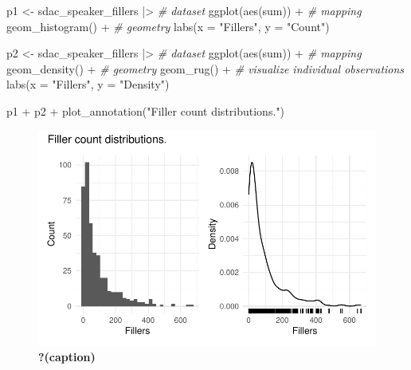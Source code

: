 \documentclass[
  letterpaper,
]{latex/krantz}
\newenvironment{Shaded}{\begin{snugshade}}{\end{snugshade}}
\newcommand{\AttributeTok}[1]{\textcolor[rgb]{0.00,0.00,0.00}{#1}}
\newcommand{\CommentTok}[1]{\textcolor[rgb]{0.00,0.00,0.00}{\textit{#1}}}
\newcommand{\FunctionTok}[1]{\textcolor[rgb]{0.00,0.00,0.00}{#1}}
\newcommand{\NormalTok}[1]{\textcolor[rgb]{0.00,0.00,0.00}{#1}}
\newcommand{\OtherTok}[1]{\textcolor[rgb]{0.00,0.00,0.00}{#1}}
\newcommand{\SpecialCharTok}[1]{\textcolor[rgb]{0.00,0.00,0.00}{#1}}
\newcommand{\StringTok}[1]{\textcolor[rgb]{0.00,0.00,0.00}{#1}}
\begin{document}
\begin{Shaded}
\begin{Highlighting}[]
\NormalTok{p1 }\OtherTok{\textless{}{-}} 
\NormalTok{  sdac\_speaker\_fillers }\SpecialCharTok{|\textgreater{}} \CommentTok{\# dataset}
  \FunctionTok{ggplot}\NormalTok{(}\FunctionTok{aes}\NormalTok{(sum)) }\SpecialCharTok{+} \CommentTok{\# mapping}
  \FunctionTok{geom\_histogram}\NormalTok{() }\SpecialCharTok{+}  \CommentTok{\# geometry}
  \FunctionTok{labs}\NormalTok{(}\AttributeTok{x =} \StringTok{"Fillers"}\NormalTok{, }\AttributeTok{y =} \StringTok{"Count"}\NormalTok{)}

\NormalTok{p2 }\OtherTok{\textless{}{-}} 
\NormalTok{  sdac\_speaker\_fillers }\SpecialCharTok{|\textgreater{}} \CommentTok{\# dataset}
  \FunctionTok{ggplot}\NormalTok{(}\FunctionTok{aes}\NormalTok{(sum)) }\SpecialCharTok{+} \CommentTok{\# mapping}
  \FunctionTok{geom\_density}\NormalTok{() }\SpecialCharTok{+} \CommentTok{\# geometry}
  \FunctionTok{geom\_rug}\NormalTok{() }\SpecialCharTok{+}  \CommentTok{\# visualize individual observations}
  \FunctionTok{labs}\NormalTok{(}\AttributeTok{x =} \StringTok{"Fillers"}\NormalTok{, }\AttributeTok{y =} \StringTok{"Density"}\NormalTok{)}

\NormalTok{p1 }\SpecialCharTok{+}\NormalTok{ p2 }\SpecialCharTok{+} \FunctionTok{plot\_annotation}\NormalTok{(}\StringTok{"Filler count distributions."}\NormalTok{)}
\end{Highlighting}
\end{Shaded}

\begin{figure}[h]

{\centering \includegraphics{inference_files/figure-pdf/fig-i-uni-cont-sdac-visual-1.pdf}

}

\caption{\label{fig-i-uni-cont-sdac-visual}\textbf{?(caption)}}

\end{figure}
\end{document}
